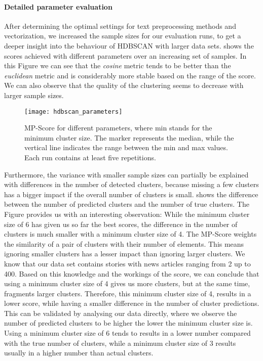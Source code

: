 \paragraph{Detailed parameter evaluation}
After determining the optimal settings for text preprocessing methods and vectorization,
we increased the sample sizes for our evaluation runs,
to get a deeper insight into the behaviour of HDBSCAN with larger data sets.
 shows the scores achieved with different parameters
over an increasing set of samples.
In this Figure we can see that the \textit{cosine} metric tends to be better than the \textit{euclidean} metric
and is considerably more stable based on the range of the score.
We can also observe that the quality of the clustering seems to decrease with larger sample sizes.

\begin{figure}[h]
    \centering
    \texttt{[image: hdbscan\_parameters]}
    \caption{
        MP-Score for different parameters, where min stands for the minimum cluster size.
        The marker represents the median, while the vertical line indicates the range between the min and max values.
        Each run contains at least five repetitions.
    }
    \label{fig:hdbscan_parameters}
\end{figure}

Furthermore, the variance with smaller sample sizes can partially be explained
with differences in the number of detected clusters,
because missing a few clusters has a bigger impact if the overall number of clusters is small.
 shows the difference between the number of predicted clusters
and the number of true clusters.
The Figure provides us with an interesting observation:
While the minimum cluster size of 6 has given us so far the best scores,
the difference in the number of clusters is much smaller with a minimum cluster size of 4.
The MP-Score weights the similarity of a pair of clusters with their number of elements.
This means ignoring smaller clusters has a lesser impact than ignoring larger clusters.
We know that our data set contains stories with news articles ranging from 2 up to 400.
Based on this knowledge and the workings of the score,
we can conclude that using a minimum cluster size of 4 gives us more clusters,
but at the same time, fragments larger clusters.
Therefore, this minimum cluster size of 4, results in a lower score,
while having a smaller difference in the number of cluster predictions.
This can be validated by analysing our data directly,
where we observe the number of predicted clusters to be higher the lower the minimum cluster size is.
Using a minimum cluster size of 6 tends to results in a lower number compared with the true number of clusters,
while a minimum cluster size of 3 results usually in a higher number than actual clusters.

